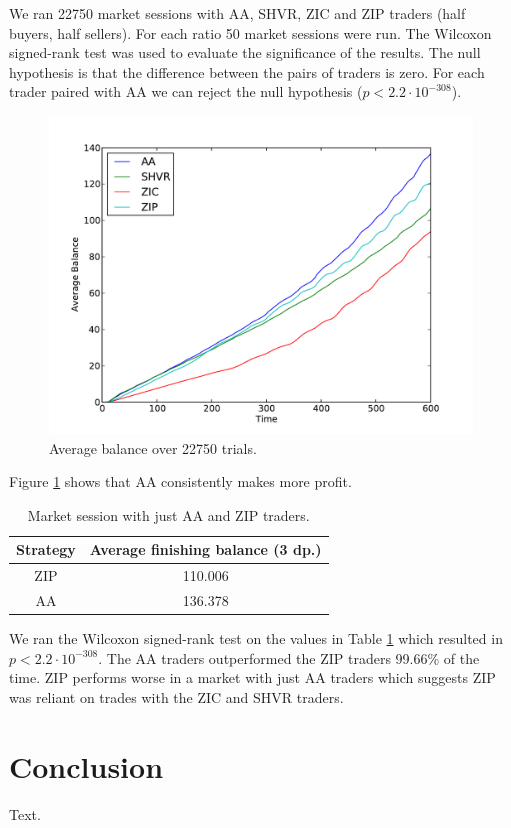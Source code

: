 \documentclass[preprint]{acm_proc_article-sp} %
\begin{document}
We ran 22750 market sessions with AA, SHVR, ZIC and ZIP traders (half
buyers, half sellers). For each ratio 50 market sessions were run. The Wilcoxon
signed-rank test was used to evaluate the significance of the results. The null
hypothesis is that the difference between the pairs of traders is zero. For
each trader paired with AA we can reject the null hypothesis ($p < 2.2 \cdot
10^{-308}$).

\begin{figure}[h]
  \label{fig:average_balance_vs_time}
  \centering
  \includegraphics[width=\columnwidth]{graphs_and_stats/graph_average_balance_vs_time.pdf}
  \caption{Average balance over 22750 trials.}
\end{figure}

Figure \ref{fig:average_balance_vs_time} shows that AA consistently makes more profit.

\begin{table}[h]
  \centering
  \label{tbl:two_traders}
  \begin{tabular}{ | c | c | }
    \hline
    Strategy & Average finishing balance (3 dp.) \\
    \hline
    ZIP & 110.006 \\
    AA & 136.378 \\
    \hline
  \end{tabular}
  \caption{Market session with just AA and ZIP traders.}
\end{table}

We ran the Wilcoxon signed-rank test on the values in Table
\ref{tbl:two_traders} which resulted in $p < 2.2 \cdot 10^{-308}$. The AA
traders outperformed the ZIP traders 99.66\% of the time. ZIP performs worse in
a market with just AA traders which suggests ZIP was reliant on trades with the
ZIC and SHVR traders.


\section{Conclusion} \label{sec:conclusion}
Text.\\


\pagebreak


\end{document}
